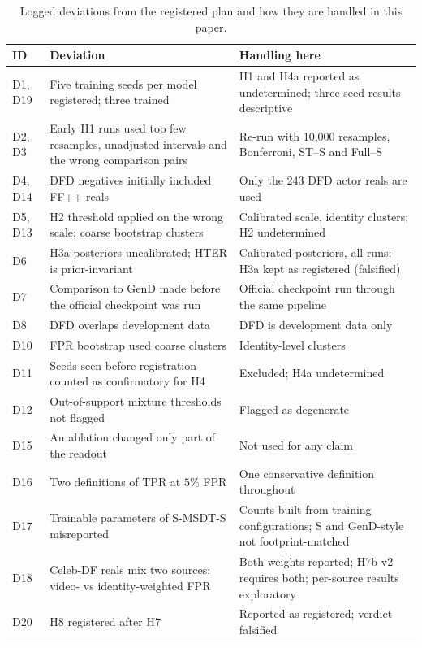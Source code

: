 \begin{table}[h]
\centering
\small
\caption{Logged deviations from the registered plan and how they are handled in this paper.}
\label{tab:dev}
\begin{tabular}{l p{6.2cm} p{6.0cm}}
\toprule
ID & Deviation & Handling here \\
\midrule
D1, D19 & Five training seeds per model registered; three trained & H1 and H4a reported as undetermined; three-seed results descriptive \\
D2, D3 & Early H1 runs used too few resamples, unadjusted intervals and the wrong comparison pairs & Re-run with 10{,}000 resamples, Bonferroni, ST--S and Full--S \\
D4, D14 & DFD negatives initially included FF++ reals & Only the 243 DFD actor reals are used \\
D5, D13 & H2 threshold applied on the wrong scale; coarse bootstrap clusters & Calibrated scale, identity clusters; H2 undetermined \\
D6 & H3a posteriors uncalibrated; HTER is prior-invariant & Calibrated posteriors, all runs; H3a kept as registered (falsified) \\
D7 & Comparison to GenD made before the official checkpoint was run & Official checkpoint run through the same pipeline \\
D8 & DFD overlaps development data & DFD is development data only \\
D10 & FPR bootstrap used coarse clusters & Identity-level clusters \\
D11 & Seeds seen before registration counted as confirmatory for H4 & Excluded; H4a undetermined \\
D12 & Out-of-support mixture thresholds not flagged & Flagged as degenerate \\
D15 & An ablation changed only part of the readout & Not used for any claim \\
D16 & Two definitions of TPR at $5\%$ FPR & One conservative definition throughout \\
D17 & Trainable parameters of S-MSDT-S misreported & Counts built from training configurations; S and GenD-style not footprint-matched \\
D18 & Celeb-DF reals mix two sources; video- vs identity-weighted FPR & Both weights reported; H7b-v2 requires both; per-source results exploratory \\
D20 & H8 registered after H7 & Reported as registered; verdict falsified \\
\bottomrule
\end{tabular}
\end{table}

